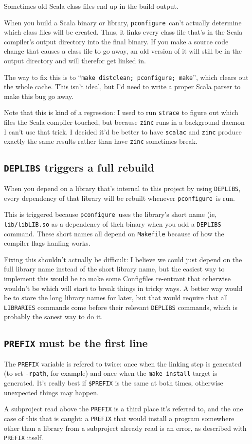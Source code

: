 \documentclass{article}
\newcommand{\pconfigure}{\texttt{pconfigure}}
\begin{document}
Sometimes old Scala class files end up in the build output.

When you build a Scala binary or library, \pconfigure\ can't actually
determine which class files will be created.  Thus, it links every
class file that's in the Scala compiler's output directory into the
final binary.  If you make a source code change that causes a class
file to go away, an old version of it will still be in the output
directory and will therefor get linked in.

The way to fix this is to ``\texttt{make distclean; pconfigure;
  make}'', which clears out the whole cache.  This isn't ideal, but
I'd need to write a proper Scala parser to make this bug go away.

Note that this is kind of a regression: I used to run \texttt{strace}
to figure out which files the Scala compiler touched, but because
\texttt{zinc} runs in a background daemon I can't use that trick.  I
decided it'd be better to have \texttt{scalac} and \texttt{zinc}
produce exactly the same results rather than have \texttt{zinc}
sometimes break.

\subsection{\texttt{DEPLIBS} triggers a full rebuild}

When you depend on a library that's internal to this project by using
\texttt{DEPLIBS}, every dependency of that library will be rebuilt
whenever \pconfigure\ is run.

This is triggered because \pconfigure\ uses the library's short name
(ie, \texttt{lib/libLIB.so} as a dependency of theh binary when you
add a \texttt{DEPLIBS} command.  These short names all depend on
\texttt{Makefile} because of how the compiler flags hanling works.

Fixing this shouldn't actually be difficult: I believe we could just
depend on the full library name instead of the short library name, but
the easiest way to implement this would be to make some Configfiles
re-entrant that otherwise wouldn't be which will start to break things
in tricky ways.  A better way would be to store the long library names
for later, but that would require that all \texttt{LIBRARIES} commands
come before their relevant \texttt{DEPLIBS} commands, which is
probably the sanest way to do it.

\subsection{\texttt{PREFIX} must be the first line \label{err::prefix}}

The \texttt{PREFIX} variable is refered to twice: once when the
linking step is generated (to set \texttt{-rpath}, for example) and
once when the \texttt{make install} target is generated.  It's really
best if \texttt{\$PREFIX} is the same at both times, otherwise
unexpected things may happen.

A subproject read above the \texttt{PREFIX} is a third place it's
referred to, and the one case of this that is caught: a \texttt{PREFIX}
that would install a program somewhere other than a library from a
subproject already read is an error, as described with
\texttt{PREFIX} itself.
\end{document}
